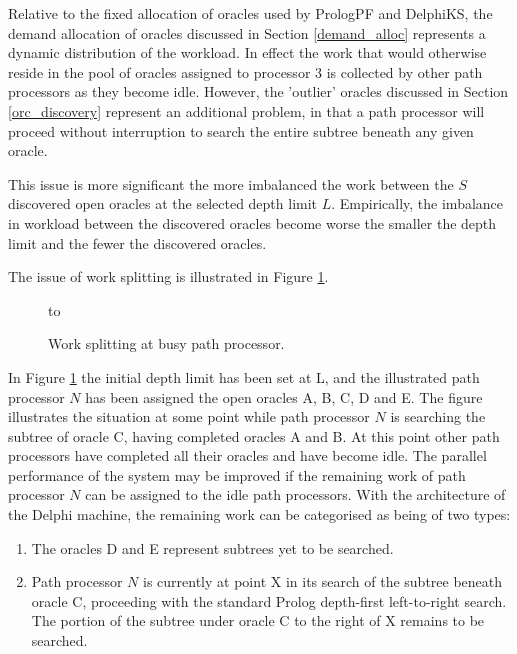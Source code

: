 Relative to the fixed allocation of oracles used by PrologPF and DelphiKS, the demand
allocation of oracles discussed in Section \ref{demand_alloc} represents a dynamic
distribution of the workload.  In effect the work that would otherwise reside in the
pool of oracles assigned to processor 3 is collected by other path processors as they
become idle.  However, the 'outlier' oracles discussed in Section \ref{orc_discovery}
represent an additional problem, in that a path processor will proceed without
interruption to search the entire subtree beneath any given oracle.

This issue is more significant the more imbalanced the work between
the $S$ discovered open oracles at the selected depth limit $L$.
Empirically, the imbalance in workload between the discovered oracles
become worse the smaller the depth limit and the fewer the discovered
oracles.

The issue of work splitting is illustrated in Figure \ref{work_split_figure}.

\begin{figure}[htbp]
\vspace{5mm} \hbox to 
\caption{Work splitting at busy path processor.}
\vspace{5mm}
\label{work_split_figure}
\end{figure}

In Figure \ref{work_split_figure} the initial depth limit has been set at L, and the
illustrated path processor $N$ has been assigned the open oracles A, B, C, D and E.
The figure illustrates the situation at some point while path processor $N$ is
searching the subtree of oracle C, having completed oracles A and B.  At this
point other path processors have completed all their oracles and have become idle.
The parallel performance of the system may be improved if the remaining work of
path processor $N$ can be assigned to the idle path processors.  With the architecture
of the Delphi machine, the remaining work can be categorised as being of two types:
\begin{enumerate}
\item{The oracles D and E represent subtrees yet to be searched.}
\item{Path processor $N$ is currently at point X in its search of the subtree beneath
  oracle C, proceeding with the standard Prolog depth-first left-to-right search.  The
  portion of the subtree under oracle C to the right of X remains to be searched.}
\end{enumerate}

